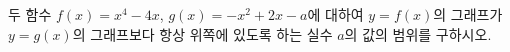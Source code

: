 두 함수 $f(x)=x^4-4x$, $g(x)=-x^2+2x-a$에 대하여 $y=f(x)$의 그래프가 $y=g(x)$의 그래프보다 항상 위쪽에 있도록 하는 실수 $a$의 값의 범위를 구하시오.
